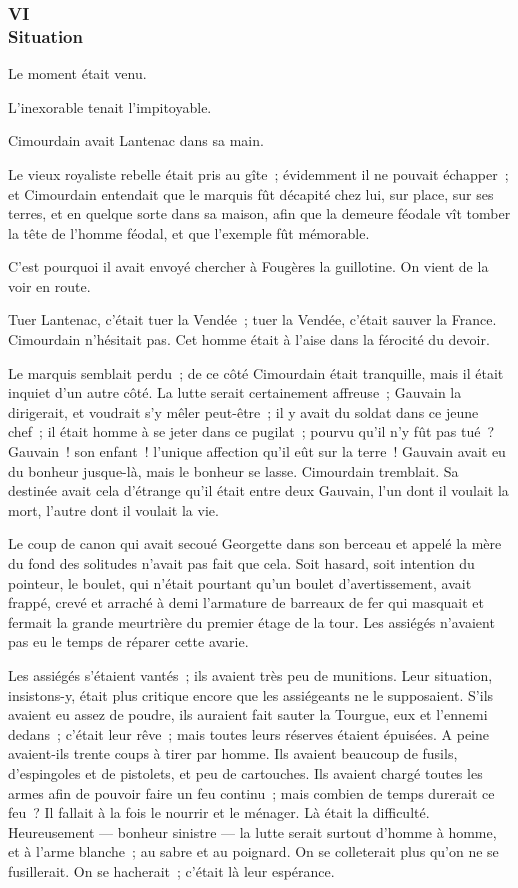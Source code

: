 \documentclass[french,twoside]{book} %
\begin{document}
 \subsubsection[{VI. Situation}]{VI \\
Situation}
\label{p3l4c6}
\noindent Le moment était venu.\par
L’inexorable tenait l’impitoyable.\par
Cimourdain avait Lantenac dans sa main.\par
Le vieux royaliste rebelle était pris au gîte ; évidemment il ne pouvait échapper ; et Cimourdain entendait que le marquis fût décapité chez lui, sur place, sur ses terres, et en quelque sorte dans sa maison, afin que la demeure féodale vît tomber la tête de l’homme féodal, et que l’exemple fût mémorable.\par
C’est pourquoi il avait envoyé chercher à Fougères la guillotine. On vient de la voir en route.\par
Tuer Lantenac, c’était tuer la Vendée ; tuer la Vendée, c’était sauver la France. Cimourdain n’hésitait pas. Cet homme était à l’aise dans la férocité du devoir.\par
Le marquis semblait perdu ; de ce côté Cimourdain était tranquille, mais il était inquiet d’un autre côté. La lutte serait certainement affreuse ; Gauvain la dirigerait, et voudrait s’y mêler peut-être ; il y avait du soldat dans ce jeune chef ; il était homme à se jeter dans ce pugilat ; pourvu qu’il n’y fût pas tué ? Gauvain ! son enfant ! l’unique affection qu’il eût sur la terre ! Gauvain avait eu du bonheur jusque-là, mais le bonheur se lasse. Cimourdain tremblait. Sa destinée avait  cela d’étrange qu’il était entre deux Gauvain, l’un dont il voulait la mort, l’autre dont il voulait la vie.\par
Le coup de canon qui avait secoué Georgette dans son berceau et appelé la mère du fond des solitudes n’avait pas fait que cela. Soit hasard, soit intention du pointeur, le boulet, qui n’était pourtant qu’un boulet d’avertissement, avait frappé, crevé et arraché à demi l’armature de barreaux de fer qui masquait et fermait la grande meurtrière du premier étage de la tour. Les assiégés n’avaient pas eu le temps de réparer cette avarie.\par
Les assiégés s’étaient vantés ; ils avaient très peu de munitions. Leur situation, insistons-y, était plus critique encore que les assiégeants ne le supposaient. S’ils avaient eu assez de poudre, ils auraient fait sauter la Tourgue, eux et l’ennemi dedans ; c’était leur rêve ; mais toutes leurs réserves étaient épuisées. A peine avaient-ils trente coups à tirer par homme. Ils avaient beaucoup de fusils, d’espingoles et de pistolets, et peu de cartouches. Ils avaient chargé toutes les armes afin de pouvoir faire un feu continu ; mais combien de temps durerait ce feu ? Il fallait à la fois le nourrir et le ménager. Là était la difficulté. Heureusement — bonheur sinistre — la lutte serait surtout d’homme à homme, et à l’arme blanche ; au sabre et au poignard. On se colleterait plus qu’on ne se fusillerait. On se hacherait ; c’était là leur espérance.\par
\end{document}

